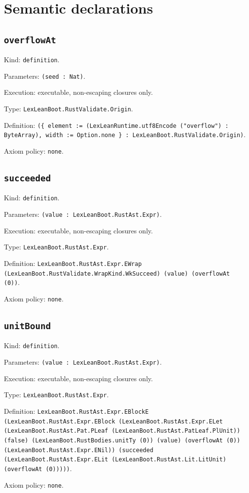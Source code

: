 \documentclass[11pt]{article}
\begin{document}
\section*{Semantic declarations}
\subsection*{\texttt{overflowAt}}
\noindent Kind: \texttt{definition}.\par
\noindent Parameters: \texttt{(seed : Nat)}.\par
\noindent Execution: executable, non-escaping closures only.\par
\noindent Type: \texttt{LexLeanBoot.RustValidate.Origin}.\par
\noindent Definition: \texttt{(\{ element := (LexLeanRuntime.utf8Encode ("overflow") : ByteArray), width := Option.none \} : LexLeanBoot.RustValidate.Origin)}.\par
\noindent Axiom policy: \texttt{none}.\par
\subsection*{\texttt{succeeded}}
\noindent Kind: \texttt{definition}.\par
\noindent Parameters: \texttt{(value : LexLeanBoot.RustAst.Expr)}.\par
\noindent Execution: executable, non-escaping closures only.\par
\noindent Type: \texttt{LexLeanBoot.RustAst.Expr}.\par
\noindent Definition: \texttt{LexLeanBoot.RustAst.Expr.EWrap (LexLeanBoot.RustValidate.WrapKind.WkSucceed) (value) (overflowAt (0))}.\par
\noindent Axiom policy: \texttt{none}.\par
\subsection*{\texttt{unitBound}}
\noindent Kind: \texttt{definition}.\par
\noindent Parameters: \texttt{(value : LexLeanBoot.RustAst.Expr)}.\par
\noindent Execution: executable, non-escaping closures only.\par
\noindent Type: \texttt{LexLeanBoot.RustAst.Expr}.\par
\noindent Definition: \texttt{LexLeanBoot.RustAst.Expr.EBlockE (LexLeanBoot.RustAst.Expr.EBlock (LexLeanBoot.RustAst.Expr.ELet (LexLeanBoot.RustAst.Pat.PLeaf (LexLeanBoot.RustAst.PatLeaf.PlUnit)) (false) (LexLeanBoot.RustBodies.unitTy (0)) (value) (overflowAt (0)) (LexLeanBoot.RustAst.Expr.ENil)) (succeeded (LexLeanBoot.RustAst.Expr.ELit (LexLeanBoot.RustAst.Lit.LitUnit) (overflowAt (0)))))}.\par
\noindent Axiom policy: \texttt{none}.\par
\end{document}
